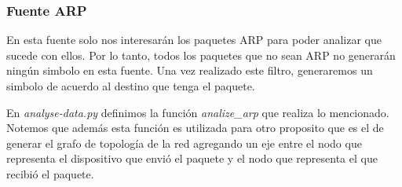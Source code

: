 \subsubsection{Fuente ARP}

En esta fuente solo nos interesar\'an los paquetes ARP para poder analizar que sucede con ellos. Por lo tanto, todos los paquetes que no sean ARP no generar\'an ning\'un simbolo en esta fuente. Una vez realizado este filtro, generaremos un simbolo de acuerdo al destino que tenga el paquete.

En \textit{analyse-data.py} definimos la funci\'on \textit{analize\_arp} que realiza lo mencionado. Notemos que adem\'as esta funci\'on es utilizada para otro proposito que es el de generar el grafo de topolog\'ia de la red agregando un eje entre el nodo que representa el dispositivo que envi\'o el paquete y el nodo que representa el que recibi\'o el paquete.
